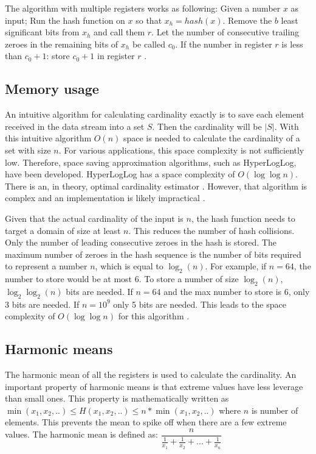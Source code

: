 The algorithm with multiple registers works as following: Given a number $x$ as input; Run the hash function on $x$ so that $x_h = hash(x)$. Remove the $b$ least significant bits from $x_h$ and call them $r$. Let the number of consecutive trailing zeroes in the remaining bits of $x_h$ be called $c_0$. If the number in register $r$ is less than $c_0 + 1$: store $c_0 + 1$ in register $r$ \cite{hyperloglog}.

\subsection{Memory usage}
An intuitive algorithm for calculating cardinality exactly is to save each element received in the data stream into a set $S$. Then the cardinality will be $|S|$. With this intuitive algorithm $O(n)$ space is needed to calculate the cardinality of a set with size $n$. For various applications, this space complexity is not sufficiently low. Therefore, space saving approximation algorithms, such as HyperLogLog, have been developed. HyperLogLog has a space complexity of $O(\log\log n)$. There is an, in theory, optimal cardinality estimator \cite{optimal_cardinality}. However, that algorithm is complex and an implementation is likely impractical \cite{google_hyperloglog}. 

Given that the actual cardinality of the input is $n$, the hash function needs to target a domain of size at least $n$. This reduces the number of hash collisions. Only the number of leading consecutive zeroes in the hash is stored. The maximum number of zeroes in the hash sequence is the number of bits required to represent a number $n$, which is equal to $\log_2(n)$. For example, if $n=64$, the number to store would be at most 6. To store a number of size $\log_2(n)$, $\log_2\log_2(n)$ bits are needed. If $n=64$ and the max number to store is 6, only 3 bits are needed. If $n=10^9$ only 5 bits are needed. This leads to the space complexity of $O(\log\log n)$ for this algorithm \cite{hyperloglog}. 


\subsection{Harmonic means}
The harmonic mean of all the registers is used to calculate the cardinality. An important property of harmonic means is that extreme values have less leverage than small ones. This property is mathematically written as $\min(x_1,x_2,..) \leq H(x_1,x_2,..) \leq n*\min(x_1,x_2,..)$ where $n$ is number of elements. This prevents the mean to spike off when there are a few extreme values. The harmonic mean is defined as: $\dfrac{n}{\frac{1}{x_1}+\frac{1}{x_2}+...+\frac{1}{x_n}}$ 

